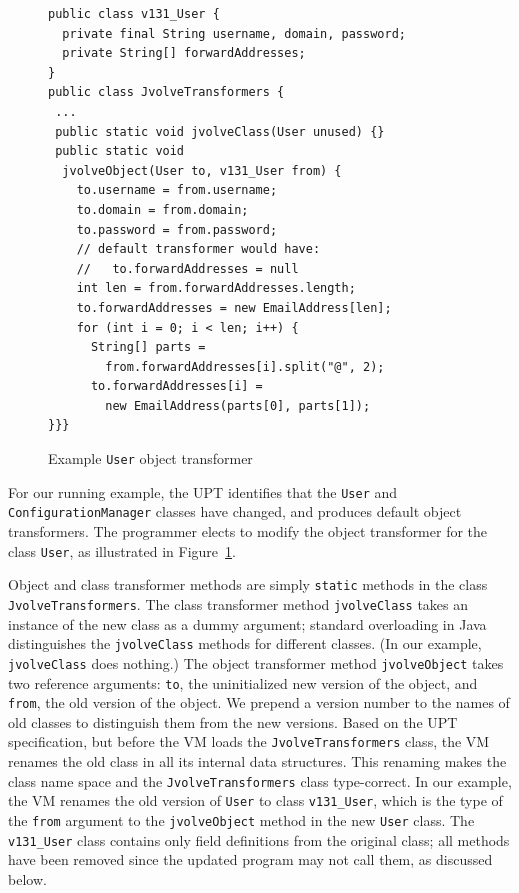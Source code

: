 \documentclass[9pt]{sigplanconf}
\begin{document}
\begin{figure}
\begin{small}
\begin{verbatim}
public class v131_User {
  private final String username, domain, password;
  private String[] forwardAddresses;
}
public class JvolveTransformers {
 ...
 public static void jvolveClass(User unused) {}
 public static void
  jvolveObject(User to, v131_User from) {
    to.username = from.username;
    to.domain = from.domain;
    to.password = from.password;
    // default transformer would have:
    //   to.forwardAddresses = null
    int len = from.forwardAddresses.length;
    to.forwardAddresses = new EmailAddress[len];
    for (int i = 0; i < len; i++) {
      String[] parts =
        from.forwardAddresses[i].split("@", 2);
      to.forwardAddresses[i] =
        new EmailAddress(parts[0], parts[1]);
}}}
\end{verbatim}
\end{small}
\caption{Example {\tt User} object transformer}
\label{fig:example-xform}
\end{figure}


For our running example, the \ac{UPT} identifies that
the {\tt User} and {\tt ConfigurationManager} classes have
changed, and produces default object transformers.  The programmer elects
to modify the object transformer for the class {\tt User}, as
illustrated in Figure~\ref{fig:example-xform}.

Object and class transformer methods are simply {\tt static}
methods in the class \texttt{JvolveTransformers}. 
The class transformer method
{\tt jvolveClass} takes an instance of the new class as a
dummy argument;  standard overloading in Java distinguishes
the {\tt jvolveClass} methods for different classes.  (In our example,
{\tt jvolveClass} does nothing.)  The
object transformer method {\tt jvolveObject} takes two reference
arguments: {\tt to}, the uninitialized new version of the object,
and {\tt from}, the old version of the object.  
We prepend a version number to the names of old classes to
distinguish them from the new versions. Based on the \ac{UPT} specification, but before the VM loads the \texttt{JvolveTransformers} class, the VM renames the old
class in all its internal data structures. This renaming makes the class name space and the \texttt{Jvolve\-Trans\-form\-ers} class type-correct.
In our example, the VM renames the old version of {\tt User} to
class {\tt v131\_User}, which is the type of the {\tt from}
argument to the {\tt jvolveObject} method in the new {\tt User}
class. The {\tt v131\_User} class contains only field definitions
from the original class; all methods have been removed since the updated
program may not call them, as discussed below.
\end{document}
